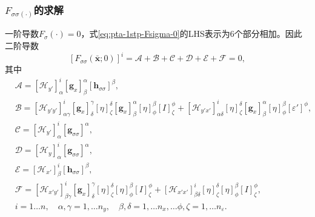 \subsubsection{$F_{\sigma \sigma (\cdot)}$的求解}
一阶导数$F_{\sigma}(\cdot) =0$，式\eqref{eq:pta-1stp-Fsigma-0}的LHS表示为6个部分相加。因此二阶导数
\begin{equation}
  \label{eq:pta-F-zero-case-sigmasigma}
    \left[F_{\sigma \sigma}(\bar{\bm{x}};0)\right]^{i} = \mathcal{A} + \mathcal{B} + \mathcal{C} + \mathcal{D} + \mathcal{E} + \mathcal{F}= 0,
\end{equation}
其中
\begin{equation*}
  \begin{split}
    &\mathcal{A} =
    \left[ \mathcal{H}_{y'} \right]^{i}_{\alpha}
    \left[ \bm{g}_{x} \right]^{\alpha}_{\beta}
    \left[ \bm{h}_{\sigma \sigma} \right]^{\beta},\\
    &\mathcal{B} =
    \left[ \mathcal{H}_{y'y'} \right]^{i}_{\alpha \gamma}
    \left[ \bm{g}_{x} \right]^{\gamma}_{\delta}
    \left[ \eta \right]^{\delta}_{\zeta}
    \left[ \bm{g}_{x} \right]^{\alpha}_{\beta}
    \left[ \eta \right]^{\beta}_{\phi}
    \left[ I \right]^{\phi}_{\zeta}
    + \left[ \mathcal{H}_{y'x'} \right]^{i}_{\alpha \delta}
    \left[ \eta \right]^{\delta}_{\zeta}
    \left[ \bm{g}_{x} \right]^{\alpha}_{\beta}
    \left[ \eta \right]^{\beta}_{\phi}
    \left[ \varepsilon' \right]^{\phi},\\
    &\mathcal{C} =
    \left[ \mathcal{H}_{y'} \right]^{i}_{\alpha}
    \left[ \bm{g}_{\sigma \sigma} \right]^{\alpha},\\
    &\mathcal{D} =
    \left[ \mathcal{H}_{y} \right]^{i}_{\alpha}
    \left[ \bm{g}_{\sigma \sigma} \right]^{\alpha},\\
    &\mathcal{E} =
    \left[ \mathcal{H}_{x'} \right]^{i}_{\beta}
    \left[ \bm{h}_{\sigma \sigma} \right]^{\beta},\\
    &\mathcal{F} =
    \left[ \mathcal{H}_{x'y'} \right]^{i}_{\beta \gamma}
    \left[ \bm{g}_{x} \right]^{\gamma}_{\delta}
    \left[ \eta \right]^{\delta}_{\zeta}
    \left[ \eta \right]^{\beta}_{\phi}
    \left[ I \right]^{\phi}_{\zeta}
    + \left[ \mathcal{H}_{x'x'} \right]^{i}_{\beta \delta}
    \left[ \eta \right]^{\delta}_{\zeta}
    \left[ \eta \right]^{\beta}_{\phi}
    \left[ I \right]^{\phi}_{\zeta},\\
    &i=1 \ldots n,\quad \alpha,\gamma = 1, \ldots n_y, \quad \beta, \delta = 1, \ldots n_x, \ldots \phi, \zeta = 1, \ldots n_{\varepsilon}.
  \end{split}
\end{equation*}

